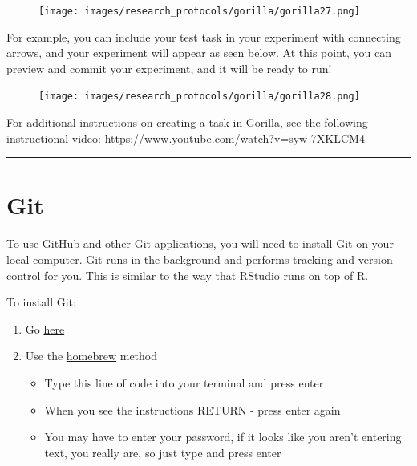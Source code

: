 \documentclass[
]{book}
\providecommand{\tightlist}{%
  \setlength{\itemsep}{0pt}\setlength{\parskip}{0pt}}
\begin{document}
\begin{figure}
\centering
\texttt{[image: images/research\_protocols/gorilla/gorilla27.png]}
\caption{}
\end{figure}

For example, you can include your test task in your experiment with connecting arrows, and your experiment will appear as seen below. At this point, you can preview and commit your experiment, and it will be ready to run!

\begin{figure}
\centering
\texttt{[image: images/research\_protocols/gorilla/gorilla28.png]}
\caption{}
\end{figure}

For additional instructions on creating a task in Gorilla, see the following instructional video: \url{https://www.youtube.com/watch?v=syw-7XKLCM4}

\begin{center}\rule{0.5\linewidth}{0.5pt}\end{center}

\hypertarget{git}{%
\section{Git}\label{git}}

To use GitHub and other Git applications, you will need to install Git on your local computer. Git runs in the background and performs tracking and version control for you. This is similar to the way that RStudio runs on top of R.

To install Git:

\begin{enumerate}
\def\labelenumi{\arabic{enumi}.}
\tightlist
\item
  Go \href{https://git-scm.com/downloads}{here}
\item
  Use the \href{https://brew.sh/}{homebrew} method

  \begin{itemize}
  \tightlist
  \item
    Type this line of code into your terminal and press enter
  \item
    When you see the instructions RETURN - press enter again
  \item
    You may have to enter your password, if it looks like you aren't entering text, you really are, so just type and press enter
  \end{itemize}
\end{enumerate}
\end{document}
